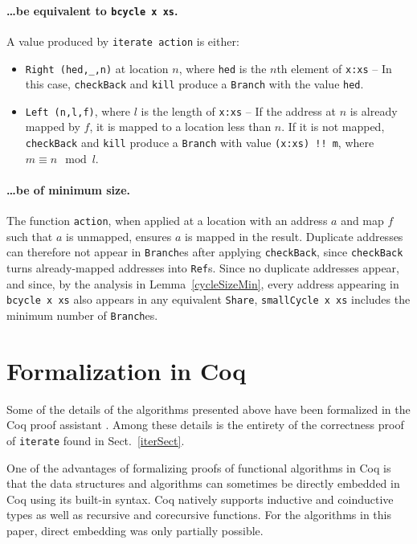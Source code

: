 \documentclass[envcountsect]{llncs}
\begin{document}
\paragraph{\ldots be equivalent to {\tt bcycle x xs}.}
A value produced by {\tt iterate action} is either:

\begin{itemize}

\item {\tt Right (hed,\_,n)} at location $n$, where {\tt hed} is the $n$th element of {\tt x:xs} 
-- In this case, {\tt checkBack} and {\tt kill} produce a {\tt Branch} with the value {\tt hed}.

\item {\tt Left (n,l,f)}, where $l$ is the length of {\tt x:xs}
-- If the address at $n$ is already mapped by $f$, it is mapped to a location less than $n$.
If it is not mapped, {\tt checkBack} and {\tt kill} produce a {\tt Branch} with value {\tt (x:xs) !! m}, where $m \equiv n \mod l$.

\end{itemize}

\paragraph{\ldots be of minimum size.}
The function {\tt action}, when applied at a location with an address $a$ and map $f$ such that $a$ is unmapped, ensures $a$ is mapped in the result.
Duplicate addresses can therefore not appear in {\tt Branch}es after applying {\tt checkBack}, since {\tt checkBack} turns already-mapped addresses into {\tt Ref}s.
Since no duplicate addresses appear, and since, by the analysis in Lemma~\ref{cycleSizeMin}, every address appearing in {\tt bcycle x xs} also appears in any equivalent {\tt Share}, {\tt smallCycle x xs} includes the minimum number of {\tt Branch}es.

\section{Formalization in Coq}
\label{coqSect}

Some of the details of the algorithms presented above have been formalized in the Coq proof assistant \cite{coq,website}.
Among these details is the entirety of the correctness proof of {\tt iterate} found in Sect.~\ref{iterSect}.

One of the advantages of formalizing proofs of functional algorithms in Coq is that the data structures and algorithms can sometimes be directly embedded in Coq using its built-in syntax.
Coq natively supports inductive and coinductive types as well as recursive  and corecursive functions.
For the algorithms in this paper, direct embedding was only partially possible.
\end{document}
